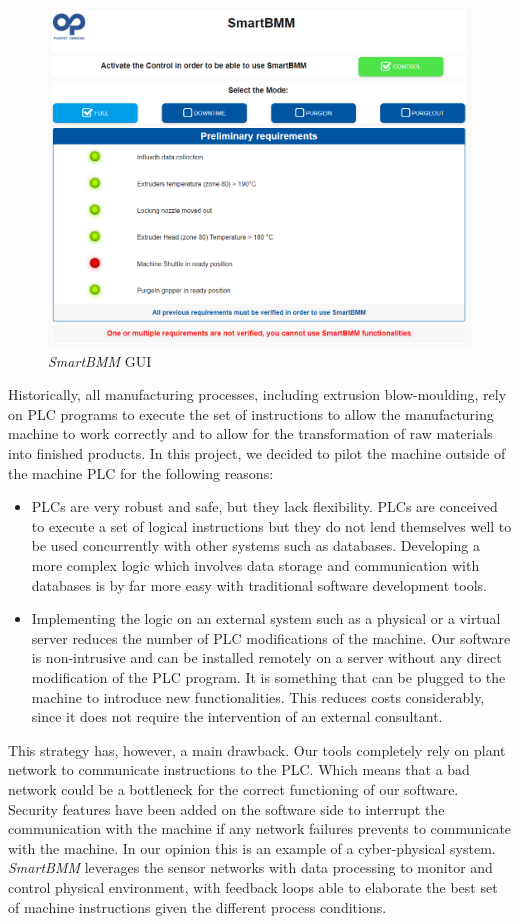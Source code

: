 \begin{figure}
\centerline{\includegraphics[scale=0.5]{images/chapter_3/SmartBMM_gui.png}}
\caption{\textit{SmartBMM} GUI}
\label{fig:SmartBMM_gui}
\end{figure}
%
Historically, all manufacturing processes, including extrusion  blow-moulding, rely on PLC programs to execute the set of instructions to allow the manufacturing machine to work correctly and to allow for the transformation of raw materials into finished products. In this project, we decided to pilot the machine outside of the machine PLC for the following reasons:
%
\begin{itemize}
    \item PLCs are very robust and safe, but they lack flexibility. PLCs are conceived to execute a set of logical instructions but they do not lend themselves well to be used concurrently with other systems such as databases. Developing a more complex logic which involves data storage and communication with databases is by far more easy with traditional software development tools.
    \item Implementing the logic on an external system such as a physical or a virtual server reduces the number of PLC modifications of the machine. Our software is  non-intrusive and can be installed remotely on a server without any direct modification of the PLC program. It is something that can be plugged to the machine to introduce new functionalities. This reduces costs considerably, since it does not require the intervention of an external consultant.
\end{itemize}
%
This strategy has, however, a main drawback. Our tools completely rely on plant network to communicate instructions to the PLC. Which means that a bad network could be a bottleneck for the correct functioning of our software. Security features have been added on the software side to interrupt the communication with the machine if any network failures prevents to communicate with the machine.
In our opinion this is an example of a cyber-physical system. \textit{SmartBMM} leverages the sensor networks with data processing to monitor and control physical environment, with feedback loops able to elaborate the best set of machine instructions given the different process conditions.


